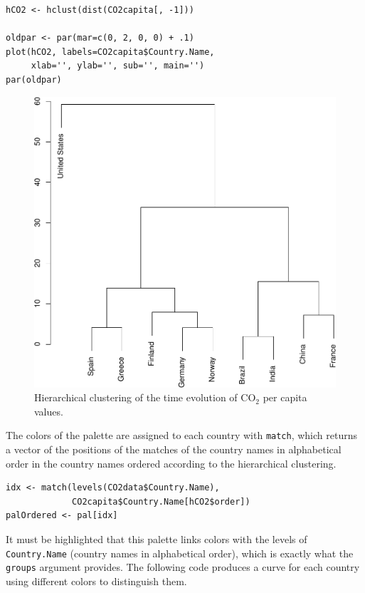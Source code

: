 \documentclass[smallroyalvopaper]{memoir}
\begin{document}

\lstset{language=r,label= ,caption= ,captionpos=b,numbers=none}
\begin{lstlisting}
hCO2 <- hclust(dist(CO2capita[, -1]))

oldpar <- par(mar=c(0, 2, 0, 0) + .1)
plot(hCO2, labels=CO2capita$Country.Name,
     xlab='', ylab='', sub='', main='')
par(oldpar)
\end{lstlisting}

\begin{figure}[htbp]
\centering
\includegraphics[width=.9\linewidth]{figs/hclust.pdf}
\caption{Hierarchical clustering of the time evolution of \(\mathrm{CO_2}\) per capita values. \label{fig:hclustCO2}}
\end{figure}


The colors of the palette are assigned to each country with \texttt{match},
which returns a vector of the positions of the matches of the country
names in alphabetical order in the country names ordered according to
the hierarchical clustering.
\lstset{language=r,label= ,caption= ,captionpos=b,numbers=none}
\begin{lstlisting}
idx <- match(levels(CO2data$Country.Name), 
             CO2capita$Country.Name[hCO2$order])
palOrdered <- pal[idx]  
\end{lstlisting}
It must be highlighted that this palette links colors with the levels
of \texttt{Country.Name} (country names in alphabetical order), which is
exactly what the \texttt{groups} argument provides. The following code
produces a curve for each country using different colors to
distinguish them.
\end{document}
